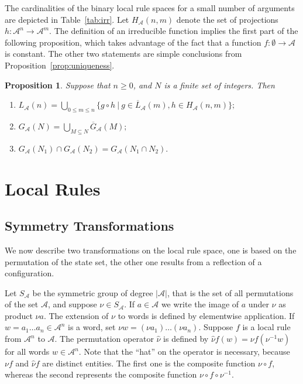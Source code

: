 \documentclass[a4paper]{article}
\newtheorem{prop}{Proposition}
\begin{document}
The cardinalities of the binary local rule spaces for a small number of arguments are
depicted in Table~\ref{tab:irr}.
Let $H_\mathcal{A}(n, m)$ denote the set of projections $h : \mathcal{A}^n \to \mathcal{A}^m$.
The definition of an irreducible function implies the first part of the following proposition,
which takes advantage of the fact that a function $f: \emptyset \to \mathcal{A}$ is constant.
The other two statements are simple conclusions from Proposition~\ref{prop:uniqueness}.
\begin{prop}
\label{prop:props}
Suppose that $n \ge 0$, and $N$ is a finite set of integers.
Then
\begin{enumerate}[label=(\roman*)]
\item
$
L_\mathcal{A}(n) = \bigcup_{0 \le m \le n} \{ g \circ h \ | \ g \in \overline{L}_\mathcal{A}(m), h \in H_\mathcal{A}(n,m) \};
$
\item
$
G_\mathcal{A}(N) = \bigcup_{M\subseteq N} \overline{G}_\mathcal{A}(M);
$
\item
$
G_\mathcal{A}(N_1) \cap G_\mathcal{A}(N_2) = G_\mathcal{A}(N_1 \cap N_2).
$
\end{enumerate}
\end{prop}
\section{Local Rules}
\label{sec:loc}

\subsection{Symmetry Transformations}
\label{sec:loc-symm}

We now describe two transformations on the local rule space, one is based
on the permutation of the state set, the other one results from a reflection of a configuration.

Let $S_\mathcal{A}$ be the symmetric group of degree $|\mathcal{A}|$,
that is the set of all permutations of the set $\mathcal{A}$,
and suppose $\nu \in S_\mathcal{A}$.
If $a \in \mathcal{A}$ we write the image of $a$ under $\nu$ as product $\nu a$.
The extension of $\nu$ to words is defined by elementwise application.
If $w = a_1\ldots a_{n} \in \mathcal{A}^n$ is a word,
set $\nu w  = (\nu a_1) \ldots (\nu a_{n})$.
Suppose $f$ is a local rule from $\mathcal{A}^n$ to $\mathcal{A}$.
The permutation operator $\hat{\nu}$ is
defined by
$\hat{\nu}f(w) = \nu f ( \nu^{-1} w)$ for all words $w \in \mathcal{A}^n$.
Note that the  ``hat'' on the operator is necessary, because $\nu f$ and
$\hat{\nu} f$ are distinct entities.
The first one is the composite function $\nu \circ f$, whereas the second represents
the composite function $\nu \circ f \circ \nu^{-1}$.
\end{document}
